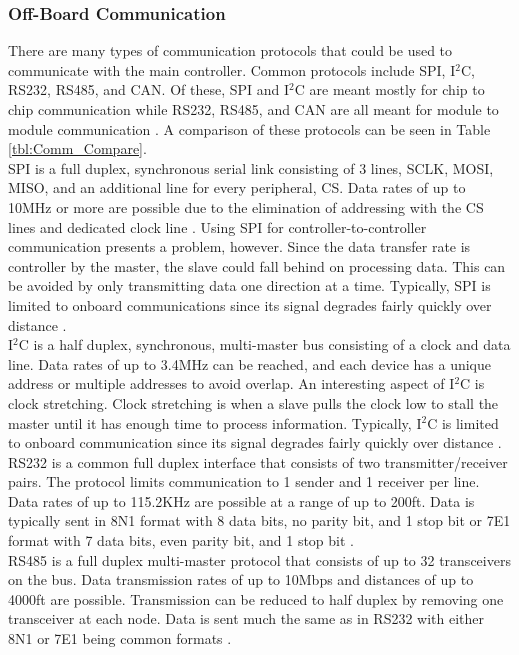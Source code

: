 \subsubsection{Off-Board Communication}
There are many types of communication protocols that could be used to communicate with the main controller. Common protocols include SPI, I$^2$C, RS232, RS485, and CAN. Of these, SPI and I$^2$C are meant mostly for chip to chip communication while RS232, RS485, and CAN are all meant for module to module communication \cite{SerialCompared}. A comparison of these protocols can be seen in Table \ref{tbl:Comm_Compare}. \\
\newline
SPI is a full duplex, synchronous serial link consisting of 3 lines, SCLK, MOSI, MISO, and an additional line for every peripheral, CS. Data rates of up to 10MHz or more are possible due to the elimination of addressing with the CS lines and dedicated clock line \cite{SerialCompared}. Using SPI for controller-to-controller communication presents a problem, however. Since the data transfer rate is controller by the master, the slave could fall behind on processing data. This can be avoided by only transmitting data one direction at a time. Typically, SPI is limited to onboard communications since its signal degrades fairly quickly over distance \cite{CANvSPI}. \\
\newline
I$^2$C is a half duplex, synchronous, multi-master bus consisting of a clock and data line. Data rates of up to 3.4MHz can be reached, and each device has a unique address or multiple addresses to avoid overlap. An interesting aspect of I$^2$C is clock stretching. Clock stretching is when a slave pulls the clock low to stall the master until it has enough time to process information. Typically, I$^2$C is limited to onboard communication since its signal degrades fairly quickly over distance \cite{SerialCompared}. \\
\newline
RS232 is a common full duplex interface that consists of two transmitter/receiver pairs. The protocol limits communication to 1 sender and 1 receiver per line. Data rates of up to 115.2KHz are possible at a range of up to 200ft. Data is typically sent in 8N1 format with 8 data bits, no parity bit, and 1 stop bit or 7E1 format with 7 data bits, even parity bit, and 1 stop bit \cite{SerialCompared}. \\
\newline
RS485 is a full duplex multi-master protocol that consists of up to 32 transceivers on the bus. Data transmission rates of up to 10Mbps and distances of up to 4000ft are possible. Transmission can be reduced to half duplex by removing one transceiver at each node. Data is sent much the same as in RS232 with either 8N1 or 7E1 being common formats \cite{SerialCompared}. \\
